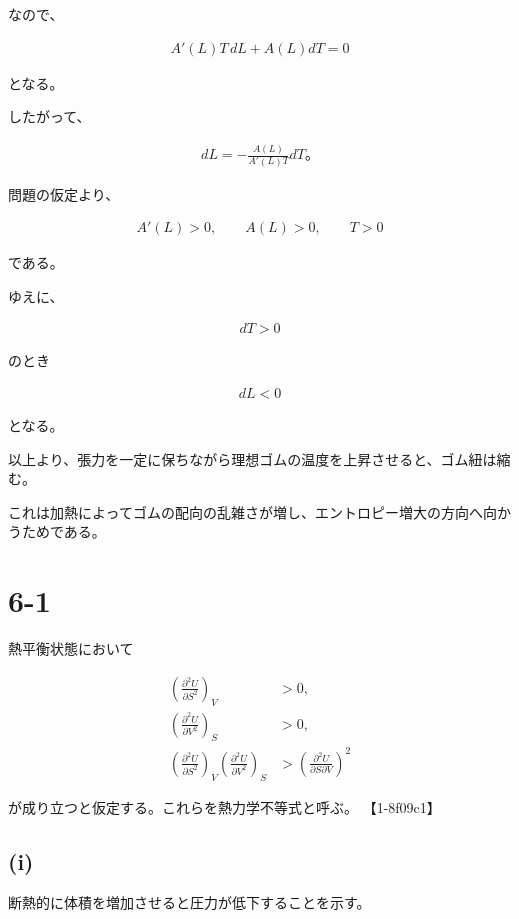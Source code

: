 \documentclass[platex,dvipdfmx,a4paper]{jsarticle}
\begin{document}
なので、

\begin{align*}
A'(L)T\,dL
+
A(L)dT
=
0
\end{align*}

となる。

したがって、

\begin{align*}
dL
=
-\frac{A(L)}{A'(L)T}
dT。
\end{align*}

問題の仮定より、

\begin{align*}
A'(L)>0,
\qquad
A(L)>0,
\qquad
T>0
\end{align*}

である。

ゆえに、

\begin{align*}
dT>0
\end{align*}

のとき

\begin{align*}
dL<0
\end{align*}

となる。

以上より、張力を一定に保ちながら理想ゴムの温度を上昇させると、ゴム紐は縮む。

これは加熱によってゴムの配向の乱雑さが増し、エントロピー増大の方向へ向かうためである。
\section{6-1}

熱平衡状態において

\begin{align*}
\left(
\frac{\partial^2 U}{\partial S^2}
\right)_V
&>0,
\\
\left(
\frac{\partial^2 U}{\partial V^2}
\right)_S
&>0,
\\
\left(
\frac{\partial^2 U}{\partial S^2}
\right)_V
\left(
\frac{\partial^2 U}{\partial V^2}
\right)_S
&>
\left(
\frac{\partial^2 U}{\partial S\partial V}
\right)^2
\end{align*}

が成り立つと仮定する。これらを熱力学不等式と呼ぶ。 【1-8f09c1】

\subsection{(i)}

断熱的に体積を増加させると圧力が低下することを示す。
\end{document}
